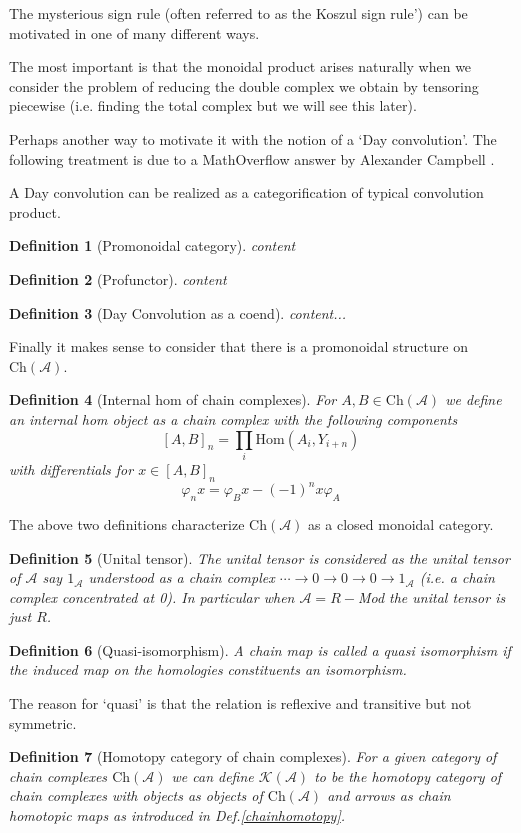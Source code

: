 \documentclass[12pt]{article}
\numberwithin{equation}{section}
\newtheorem{definition}{Definition}[section]
\begin{document}
	The mysterious sign rule (often referred to as the Koszul sign rule') can be motivated in one of many different ways. 
	
	The most important is that the monoidal product arises naturally when we consider the problem of reducing the double complex we obtain by tensoring piecewise (i.e. finding the total complex but we will see this later).
	
	Perhaps another way to motivate it with the notion of a `Day convolution'. The following treatment is due to a MathOverflow answer by Alexander Campbell \cite{359316}.
	
	A Day convolution can be realized as a categorification of typical convolution product.
	\begin{definition}[Promonoidal category]
		content
	\end{definition}
	\begin{definition}[Profunctor]
		content
	\end{definition}
	\begin{definition}[Day Convolution as a coend]
		content...
	\end{definition}
	Finally it makes sense to consider that there is a promonoidal structure on $\mathrm{Ch}(\mathcal{A})$.
		
	\begin{definition}[Internal hom of chain complexes]\label{internalchain}
		For $A,B \in \mathrm{Ch}(\mathcal{A})$ we define an internal hom object as a chain complex with the following components
		\[ [A,B]_n=\prod_i \mathrm{Hom}(A_i,Y_{i+n})\]
		with differentials for $x \in [A,B]_n$
		\[ \varphi_n x= \varphi_B x-(-1)^n x \varphi_A \]
	\end{definition}
	The above two definitions characterize $\mathrm{Ch}(\mathcal{A})$ as a closed monoidal category. 
	\begin{definition}[Unital tensor]\label{chunittensor}
			The unital tensor is considered as the unital tensor of $\mathcal{A}$ say $1_\mathcal{A}$ understood as a chain complex $\cdots \to 0\to0 \to 0 \to 1_\mathcal{A}$ (i.e. a chain complex concentrated at 0). In particular when $\mathcal{A}=R-$Mod the unital tensor is just $R$.
	\end{definition}

	
	
	
	\begin{definition}[Quasi-isomorphism]
		A chain map is called a quasi isomorphism if the induced map on the homologies constituents an isomorphism.
	\end{definition}
	The reason for `quasi' is that the relation is reflexive and transitive but not symmetric. 
	\begin{definition}[Homotopy category of chain complexes]
		For a given category of chain complexes $\mathrm{Ch}(\mathcal{A})$ we can define $\mathcal{K}(\mathcal{A})$ to be the homotopy category of chain complexes with objects as objects of $\mathrm{Ch}(\mathcal{A})$ and arrows as chain homotopic maps as introduced in Def.\ref{chainhomotopy}.
	\end{definition}
	
\end{document}
